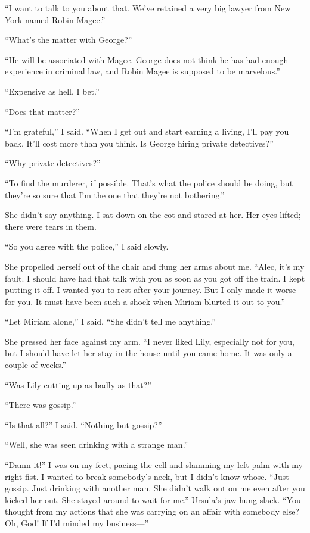 \documentclass{novel}
\begin{document}
{“I want to talk to you about that. We’ve retained a very big lawyer from New York named Robin Magee.”

“What’s the matter with George?”

“He will be associated with Magee. George does not think he has had enough experience in criminal law, and Robin Magee is supposed to be marvelous.”

“Expensive as hell, I bet.”

“Does that matter?”

“I’m grateful,” I said. “When I get out and start earning a living, I’ll pay you back. It’ll cost more than you think. Is George hiring private detectives?”

“Why private detectives?”

“To find the murderer, if possible. That’s what the police should be doing, but they’re so sure that I’m the one that they’re not bothering.”

She didn’t say anything. I sat down on the cot and stared at her. Her eyes lifted; there were tears in them.

“So you agree with the police,” I said slowly.

She propelled herself out of the chair and flung her arms about me. “Alec, it’s my fault. I should have had that talk with you as soon as you got off the train. I kept putting it off. I wanted you to rest after your journey. But I only made it worse for you. It must have been such a shock when Miriam blurted it out to you.”

“Let Miriam alone,” I said. “She didn’t tell me anything.”

She pressed her face against my arm. “I never liked Lily, especially not for you, but I should have let her stay in the house until you came home. It was only a couple of weeks.”

“Was Lily cutting up as badly as that?”

“There was gossip.”

“Is that all?” I said. “Nothing but gossip?”

“Well, she was seen drinking with a strange man.”

“Damn it!” I was on my feet, pacing the cell and slamming my left palm with my right fist. I wanted to break somebody’s neck, but I didn’t know whose. “Just gossip. Just drinking with another man. She didn’t walk out on me even after you kicked her out. She stayed around to wait for me.” Ursula’s jaw hung slack. “You thought from my actions that she was carrying on an affair with somebody else? Oh, God! If I’d minded my business—”

}
\end{document}
